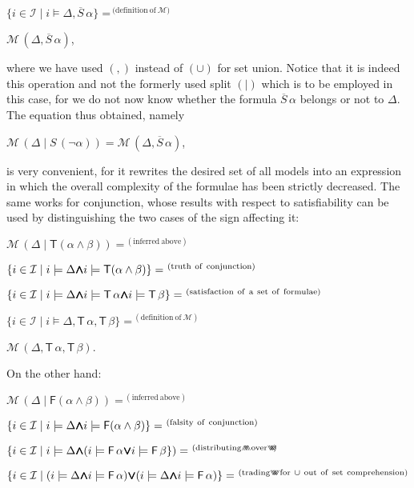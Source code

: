 \documentclass[a4paper,UKenglish]{lipics}
\newcounter{c}
\newcommand{\sg}[1]{\textsf{#1}}
\newcommand{\op}[1]{\ensuremath{\overline{#1}}}
\newcommand{\interprt}{\ensuremath{\mathcal{I}}}
\newcommand{\sat}[2]{\ensuremath{#1\models#2}}
\newcommand{\allmodels}{\ensuremath{\mathcal{M}}}
\newcommand{\iset}[1]{\ensuremath{\{i\in\interprt \mid #1\}}}
\newcommand{\ssplit}[2]{\ensuremath{#1\!\mid\!#2}}
\newcommand{\Mwedge}{\ensuremath{{\wedge\hspace{-0.65em}\wedge}\hspace{-0.65em}{\wedge\hspace{-0.65em}\wedge}}}
\newcommand{\Mvee}{\ensuremath{{\vee\hspace{-0.65em}\vee}\hspace{-0.65em}{\vee\hspace{-0.65em}\vee}}}
\begin{document}
$\iset{\sat{i}{\Delta, \op{S}\,\alpha}}
{=}^{\mathrm{\ (definition\ of\ } \allmodels)}$

$\allmodels\,(\Delta, \op{S}\,\alpha)$,



\noindent where we have used $(,)$ instead of $(\cup)$ for set union. 
Notice that it is indeed this operation and not the formerly used split $(\mid)$ which is to be employed in this case, for we do not now know whether the formula $\op{S}\,\alpha$
belongs or not to $\Delta$.
The equation thus obtained, namely

$\allmodels\,(\ssplit{\Delta}{S\,(\neg\alpha)}) = \allmodels\,(\Delta, \op{S}\,\alpha)$,



\noindent is very convenient, for it rewrites the desired set of all models into an expression in which the overall complexity of the formulae has been strictly decreased. The same works for conjunction, whose results with respect to satisfiability can be used by distinguishing the two cases of the sign affecting it:



$\allmodels\,(\ssplit{\Delta}{\sg{T}(\alpha\wedge\beta)})
=^{\mathrm{\ (inferred\ above)}}$

$\iset{\sat{i}{\Delta} \Mwedge \sat{i}{\sg{T}(\alpha\wedge\beta)}}
=^{\mathrm{\ (truth\ of\ conjunction)}}$

$\iset{\sat{i}{\Delta} \Mwedge \sat{i}{\sg{T}\,\alpha} \Mwedge \sat{i}{\sg{T}\,\beta}}
=^{\mathrm{\ (satisfaction\ of\ a\ set\ of\ formulae)}}$

$\iset{\sat{i}{\Delta, \sg{T}\,\alpha,\sg{T}\,\beta}}
=^{\mathrm{\ (definition\ of\ \allmodels)}}$

$\allmodels\,(\Delta, \sg{T}\,\alpha,\sg{T}\,\beta)$.



\noindent On the other hand:



$\allmodels\,(\ssplit{\Delta}{\sg{F}(\alpha\wedge\beta)})
=^{\mathrm{\ (inferred\ above)}}$

$\iset{\sat{i}{\Delta} \Mwedge \sat{i}{\sg{F}(\alpha\wedge\beta)}}
=^{\mathrm{\ (falsity\ of\ conjunction)}}$

$\iset{\sat{i}{\Delta} \Mwedge (\sat{i}{\sg{F}\,\alpha} \Mvee \sat{i}{\sg{F}\,\beta}})
=^{\mathrm{\ (distributing\ } \Mwedge\ \mathrm{ over\ } \Mvee)}$

$\iset{(\sat{i}{\Delta} \Mwedge \sat{i}{\sg{F}\,\alpha}) \Mvee (\sat{i}{\Delta} \Mwedge \sat{i}{\sg{F}\,\alpha})}
=^{\mathrm{\ (trading\ } \Mvee\ \mathrm{for\ } \cup\  \mathrm{out\ of\ set\ comprehension)}}$
\end{document}
